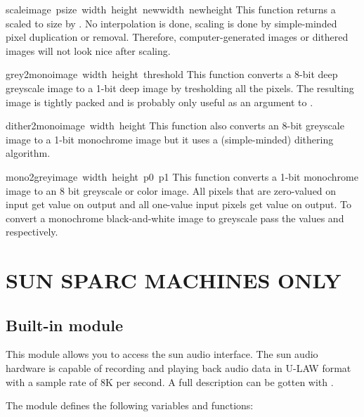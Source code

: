 \begin{funcdesc}{scale}{image\, psize\, width\, height\, newwidth\, newheight}
This function returns a  scaled to size  by
. No interpolation is done, scaling is done by
simple-minded pixel duplication or removal. Therefore, computer-generated
images or dithered images will not look nice after scaling.
\end{funcdesc}

\begin{funcdesc}{grey2mono}{image\, width\, height\, threshold}
This function converts a 8-bit deep greyscale image to a 1-bit deep
image by tresholding all the pixels. The resulting image is tightly
packed and is probably only useful as an argument to .
\end{funcdesc}

\begin{funcdesc}{dither2mono}{image\, width\, height}
This function also converts an 8-bit greyscale image to a 1-bit
monochrome image but it uses a (simple-minded) dithering algorithm.
\end{funcdesc}

\begin{funcdesc}{mono2grey}{image\, width\, height\, p0\, p1}
This function converts a 1-bit monochrome image to an 8 bit greyscale
or color image. All pixels that are zero-valued on input get value
 on output and all one-value input pixels get value 
on output. To convert a monochrome black-and-white image to greyscale
pass the values  and  respectively.
\end{funcdesc}

\chapter{SUN SPARC MACHINES ONLY}

\section{Built-in module }

This module allows you to access the sun audio interface. The sun
audio hardware is capable of recording and playing back audio data
in U-LAW format with a sample rate of 8K per second. A full
description can be gotten with .

The module defines the following variables and functions:

